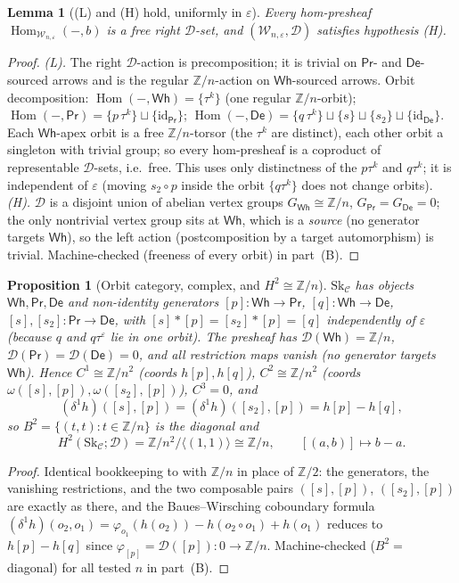 \documentclass[11pt]{article}
\newtheorem{proposition}[theorem]{Proposition}
\newtheorem{lemma}[theorem]{Lemma}
\theoremstyle{definition}
\newcommand{\Hom}{\operatorname{Hom}}
\newcommand{\id}{\mathrm{id}}
\newcommand{\C}{\mathcal{C}}
\newcommand{\D}{\mathcal{D}}
\newcommand{\W}{\mathcal{W}}
\newcommand{\Sk}{\mathrm{Sk}}
\newcommand{\Wh}{\mathsf{Wh}}
\newcommand{\Prc}{\mathsf{Pr}}
\newcommand{\De}{\mathsf{De}}
\newcommand{\Zn}{\mathbb{Z}/n}
\begin{document}
\begin{lemma}[(L) and (H) hold, uniformly in $\varepsilon$]\label{lem:LH}
Every hom-presheaf $\Hom_{\W_{n,\varepsilon}}(-,b)$ is a free right $\D$-set, and
$(\W_{n,\varepsilon},\D)$ satisfies hypothesis (H).
\end{lemma}
\begin{proof}
\emph{(L).} The right $\D$-action is precomposition; it is trivial on $\Prc$- and
$\De$-sourced arrows and is the regular $\Zn$-action on $\Wh$-sourced arrows. Orbit
decomposition:
$\Hom(-,\Wh)=\{\tau^k\}$ (one regular $\Zn$-orbit);
$\Hom(-,\Prc)=\{p\,\tau^k\}\sqcup\{\id_\Prc\}$;
$\Hom(-,\De)=\{q\,\tau^k\}\sqcup\{s\}\sqcup\{s_2\}\sqcup\{\id_\De\}$.
Each $\Wh$-apex orbit is a free $\Zn$-torsor (the $\tau^k$ are distinct), each other
orbit a singleton with trivial group; so every hom-presheaf is a coproduct of
representable $\D$-sets, i.e.\ free. This uses only distinctness of the $p\tau^k$ and
$q\tau^k$; it is independent of $\varepsilon$ (moving $s_2\circ p$ inside the orbit
$\{q\tau^k\}$ does not change orbits). \emph{(H).} $\D$ is a disjoint union of abelian
vertex groups $G_\Wh\cong\Zn$, $G_\Prc=G_\De=0$; the only nontrivial vertex group sits
at $\Wh$, which is a \emph{source} (no generator targets $\Wh$), so the left action
(postcomposition by a target automorphism) is trivial. Machine-checked (freeness of
every orbit) in part~(B).
\end{proof}

\begin{proposition}[Orbit category, complex, and $H^2\cong\Zn$]\label{prop:h2}
$\Sk_\C$ has objects $\Wh,\Prc,\De$ and non-identity generators $[p]:\Wh\to\Prc$,
$[q]:\Wh\to\De$, $[s],[s_2]:\Prc\to\De$, with
$[s]\ast[p]=[s_2]\ast[p]=[q]$ \emph{independently of $\varepsilon$} (because $q$ and
$q\tau^\varepsilon$ lie in one orbit). The presheaf has $\D(\Wh)=\Zn$,
$\D(\Prc)=\D(\De)=0$, and all restriction maps vanish (no generator targets $\Wh$).
Hence $C^1\cong\Zn^2$ (coords $h[p],h[q]$), $C^2\cong\Zn^2$ (coords
$\omega([s],[p]),\omega([s_2],[p])$), $C^3=0$, and
\[
   (\delta^1h)([s],[p])=(\delta^1h)([s_2],[p])=h[p]-h[q],
\]
so $B^2=\{(t,t):t\in\Zn\}$ is the diagonal and
\[
   H^2(\Sk_\C;\D)=\Zn^2/\langle(1,1)\rangle\cong\Zn,\qquad [(a,b)]\mapsto b-a.
\]
\end{proposition}
\begin{proof}
Identical bookkeeping to \cite[\S4]{orch} with $\Zn$ in place of $\mathbb Z/2$: the
generators, the vanishing restrictions, and the two composable pairs $([s],[p])$,
$([s_2],[p])$ are exactly as there, and the Baues--Wirsching coboundary formula
$(\delta^1h)(o_2,o_1)=\varphi_{o_1}(h(o_2))-h(o_2\circ o_1)+h(o_1)$ reduces to
$h[p]-h[q]$ since $\varphi_{[p]}=\D([p]):0\to\Zn$. Machine-checked
($B^2=$ diagonal) for all tested $n$ in part~(B).
\end{proof}
\end{document}
